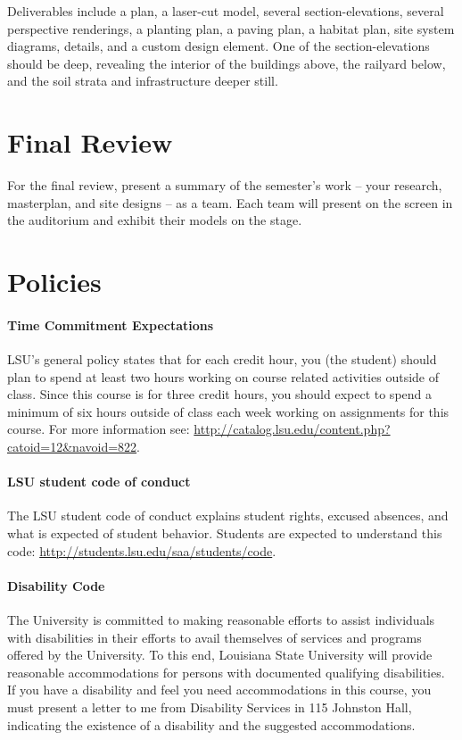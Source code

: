 \documentclass[11pt,article,oneside]{memoir}
\begin{document}
\noindent
Deliverables include a plan, a laser-cut model, several section-elevations, several perspective renderings, a planting plan, a paving plan, a habitat plan, site system diagrams, details, and a custom design element. One of the section-elevations should be deep, revealing the interior of the buildings above, the railyard below, and the soil strata and infrastructure deeper still.

\section{Final Review}
For the final review, present a summary of the semester's work -- your research, masterplan, and site designs -- as a team. Each team will present on the screen in the auditorium and exhibit their models on the stage. 


\section{Policies}

\paragraph{Time Commitment Expectations}
LSU's general policy states that for each credit hour, 
you (the student) should plan to
spend at least two hours working 
on course related activities outside of class. 
Since this course is for three credit hours, 
you should expect to spend a minimum of six hours 
outside of class each week 
working on assignments for this course. 
For more information see: 
\url{http://catalog.lsu.edu/content.php?catoid=12&navoid=822}.

\paragraph{LSU student code of conduct}
The LSU student code of conduct explains 
student rights, excused absences, 
and what is expected of student behavior. 
Students are expected to understand this code:  
\url{http://students.lsu.edu/saa/students/code}.

\paragraph{Disability Code}
The University is committed to making reasonable efforts 
to assist individuals with disabilities in
their efforts to avail themselves of 
services and programs offered by the University. 
To this end, Louisiana State University will provide 
reasonable accommodations for persons
with documented qualifying disabilities.
 If you have a disability and 
 feel you need accommodations in this course, 
 you must present a letter to me 
 from Disability Services in 115 Johnston Hall,
indicating the existence of a disability 
and the suggested accommodations.
\end{document}

